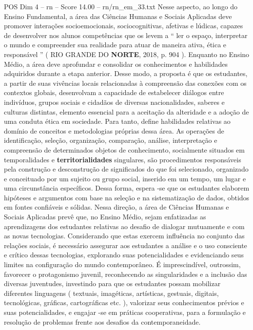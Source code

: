 \begin{textsample}{POS Dim 4 – rn – Score 14.00 – rn/rn\_em\_33.txt}  \label{ex:f4_pos_083}
Nesse aspecto, ao longo do Ensino Fundamental, a área das Ciências Humanas e Sociais Aplicadas deve promover interações socioemocionais, sociocognitivas, afetivas e lúdicas, capazes de desenvolver nos alunos competências que os levem a “ ler o espaço, interpretar o mundo e compreender sua realidade para atuar de maneira ativa, ética e responsável ” ( RIO GRANDE DO \textbf{NORTE}, 2018, p. 904 ).
Enquanto no Ensino Médio, a área deve aprofundar e consolidar os conhecimentos e habilidades adquiridos durante a etapa anterior.
Desse modo, a proposta é que os estudantes, a partir de suas vivências locais relacionadas à compreensão das conexões com os contextos globais, desenvolvam a capacidade de estabelecer diálogos entre indivíduos, grupos sociais e cidadãos de diversas nacionalidades, saberes e culturas distintas, elemento essencial para a aceitação da alteridade e a adoção de uma conduta ética em sociedade.
Para tanto, define habilidades relativas ao domínio de conceitos e metodologias próprias dessa área.
As operações de identificação, seleção, organização, comparação, análise, interpretação e compreensão de determinados objetos de conhecimento, socialmente situados em temporalidades e \textbf{territorialidades} singulares, são procedimentos responsáveis pela construção e desconstrução de significados do que foi selecionado, organizado e conceituado por um sujeito ou grupo social, inserido em um tempo, um lugar e uma circunstância específicos.
Dessa forma, espera -se que os estudantes elaborem hipóteses e argumentos com base na seleção e na sistematização de dados, obtidos em fontes confiáveis e sólidas.
Nessa direção, a área de Ciências Humanas e Sociais Aplicadas prevê que, no Ensino Médio, sejam enfatizadas as aprendizagens dos estudantes relativas ao desafio de dialogar mutuamente e com as novas tecnologias.
Considerando que estas exercem influência no conjunto das relações sociais, é necessário assegurar aos estudantes a análise e o uso consciente e crítico dessas tecnologias, explorando suas potencialidades e evidenciando seus limites na configuração do mundo contemporâneo.
É imprescindível, outrossim, favorecer o protagonismo juvenil, reconhecendo as singularidades e a inclusão das diversas juventudes, investindo para que os estudantes possam mobilizar diferentes linguagens ( textuais, imagéticas, artísticas, gestuais, digitais, tecnológicas, gráficas, cartográficas etc. ), valorizar seus conhecimentos prévios e suas potencialidades, e engajar -se em práticas cooperativas, para a formulação e resolução de problemas frente aos desafios da contemporaneidade.

\end{textsample}
